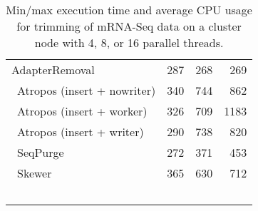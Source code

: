 \begin{table}[ht]
\begin{tabular}{lrrr}
        AdapterRemoval &
        
        287 &
        
        
        268 &
        
        
        269
        
        \\\    
        Atropos (insert + nowriter) &
        
        340 &
        
        
        744 &
        
        
        862
        
        \\\    
        Atropos (insert + worker) &
        
        326 &
        
        
        709 &
        
        
        1183
        
        \\\    
        Atropos (insert + writer) &
        
        290 &
        
        
        738 &
        
        
        820
        
        \\\    
        SeqPurge &
        
        272 &
        
        
        371 &
        
        
        453
        
        \\\    
        Skewer &
        
        365 &
        
        
        630 &
        
        
        712
        
        \\\    
\end{tabular}
\caption{Min/max execution time and average CPU usage for trimming of mRNA-Seq data on a cluster node with 4, 8, or 16 parallel threads.\label{tab:real-performance-rnaseq}}
\end{table}

